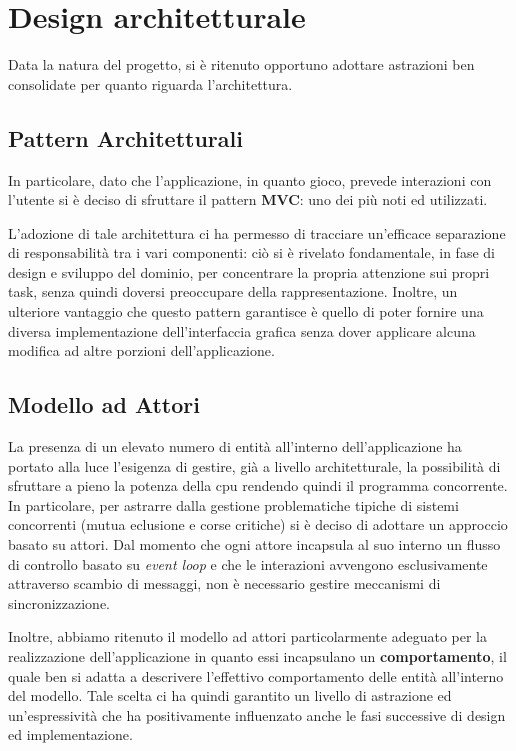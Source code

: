 
\section{Design architetturale}\label{sec:architectural-design}
Data la natura del progetto, si è ritenuto opportuno adottare astrazioni ben consolidate per quanto riguarda
l'architettura.

\subsection{Pattern Architetturali}
In particolare, dato che l'applicazione, in quanto gioco, prevede interazioni con l'utente si è deciso
di sfruttare il pattern \textbf{MVC}: uno dei più noti ed utilizzati.

L'adozione di tale architettura ci ha permesso di tracciare un'efficace separazione di responsabilità
tra i vari componenti:
ciò si è rivelato fondamentale, in fase di design e sviluppo del dominio, per concentrare la propria attenzione
sui propri task, senza quindi doversi preoccupare della rappresentazione.
Inoltre, un ulteriore vantaggio che questo pattern garantisce è quello di poter fornire una diversa
implementazione dell'interfaccia grafica senza dover applicare alcuna modifica ad altre porzioni dell'applicazione.

\subsection{Modello ad Attori}
La presenza di un elevato numero di entità all'interno dell'applicazione ha portato alla luce l'esigenza di gestire,
già a livello architetturale, la possibilità di sfruttare a pieno la potenza della cpu rendendo quindi il programma
concorrente. In particolare, per astrarre dalla gestione problematiche tipiche di sistemi concorrenti
(mutua eclusione e corse critiche) si è deciso di adottare un approccio basato su attori. Dal momento che ogni attore
incapsula al suo interno un flusso di controllo basato su \textit{event loop} e che le interazioni avvengono
esclusivamente attraverso scambio di messaggi, non è necessario gestire meccanismi di sincronizzazione.

Inoltre, abbiamo ritenuto il modello ad attori particolarmente adeguato per la realizzazione dell'applicazione
in quanto essi incapsulano un \textbf{comportamento}, il quale ben si adatta a descrivere l'effettivo comportamento
delle entità all'interno del modello. Tale scelta ci ha quindi garantito un livello di astrazione ed un'espressività
che ha positivamente influenzato anche le fasi successive di design ed implementazione.

